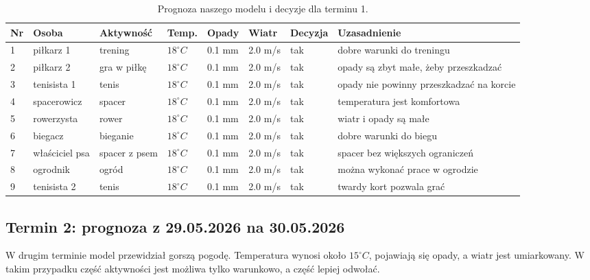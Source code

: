 \documentclass[a4paper,12pt]{article}
\begin{document}
\begin{table}[H]
\centering
\scriptsize
\begin{tabular}{p{0.5cm}p{1.7cm}p{2.0cm}p{1.4cm}p{1.3cm}p{1.2cm}p{1.5cm}p{2.3cm}}
\toprule
\textbf{Nr} & \textbf{Osoba} & \textbf{Aktywność} & \textbf{Temp.} & \textbf{Opady} & \textbf{Wiatr} & \textbf{Decyzja} & \textbf{Uzasadnienie} \\
\midrule
1 & piłkarz 1 & trening & $18^\circ C$ & 0.1 mm & 2.0 m/s & tak & dobre warunki do treningu \\[12pt]
2 & piłkarz 2 & gra w piłkę & $18^\circ C$ & 0.1 mm & 2.0 m/s & tak & opady są zbyt małe, żeby przeszkadzać \\[12pt]
3 & tenisista 1 & tenis & $18^\circ C$ & 0.1 mm & 2.0 m/s & tak & opady nie powinny przeszkadzać na korcie \\[12pt]
4 & spacerowicz & spacer & $18^\circ C$ & 0.1 mm & 2.0 m/s & tak & temperatura jest komfortowa \\[12pt]
5 & rowerzysta & rower & $18^\circ C$ & 0.1 mm & 2.0 m/s & tak & wiatr i opady są małe \\[12pt]
6 & biegacz & bieganie & $18^\circ C$ & 0.1 mm & 2.0 m/s & tak & dobre warunki do biegu \\[12pt]
7 & właściciel psa & spacer z psem & $18^\circ C$ & 0.1 mm & 2.0 m/s & tak & spacer bez większych ograniczeń \\[12pt]
8 & ogrodnik & ogród & $18^\circ C$ & 0.1 mm & 2.0 m/s & tak & można wykonać prace w ogrodzie \\[12pt]
9 & tenisista 2 & tenis & $18^\circ C$ & 0.1 mm & 2.0 m/s & tak & twardy kort pozwala grać \\
\bottomrule
\end{tabular}
\caption{Prognoza naszego modelu i decyzje dla terminu 1.}
\end{table}
\newpage
\subsection{Termin 2: prognoza z 29.05.2026 na 30.05.2026}

W drugim terminie model przewidział gorszą pogodę. Temperatura wynosi około
$15^\circ C$, pojawiają się opady, a wiatr jest umiarkowany. W takim przypadku
część aktywności jest możliwa tylko warunkowo, a część lepiej odwołać.
\end{document}
